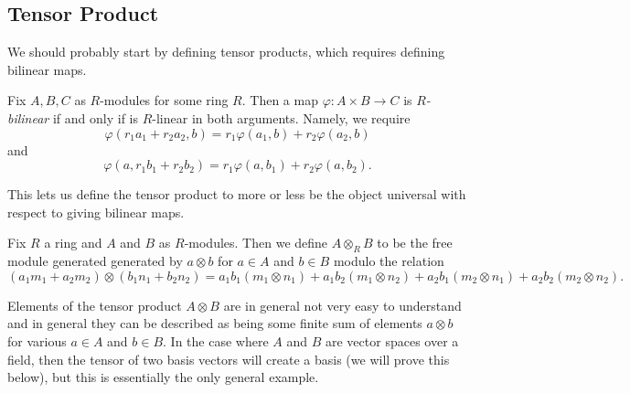 \subsection{Tensor Product}
We should probably start by defining tensor products, which requires defining bilinear maps.
\begin{definition}[Bilinear]
	Fix $A,B,C$ as $R$-modules for some ring $R$. Then a map $\varphi:A\times B\to C$ is \textit{$R$-bilinear} if and only if is $R$-linear in both arguments. Namely, we require
	\[\varphi(r_1a_1+r_2a_2,b)=r_1\varphi(a_1,b)+r_2\varphi(a_2,b)\]
	and
	\[\varphi(a,r_1b_1+r_2b_2)=r_1\varphi(a,b_1)+r_2\varphi(a,b_2).\]
\end{definition}
This lets us define the tensor product to more or less be the object universal with respect to giving bilinear maps.
\begin{definition}
	Fix $R$ a ring and $A$ and $B$ as $R$-modules. Then we define $A\otimes_RB$ to be the free module generated generated by $a\otimes b$ for $a\in A$ and $b\in B$ modulo the relation
	\[(a_1m_1+a_2m_2)\otimes(b_1n_1+b_2n_2)=a_1b_1(m_1\otimes n_1)+a_1b_2(m_1\otimes n_2)+a_2b_1(m_2\otimes n_1)+a_2b_2(m_2\otimes n_2).\]
\end{definition}
Elements of the tensor product $A\otimes B$ are in general not very easy to understand and in general they can be described as being some finite sum of elements $a\otimes b$ for various $a\in A$ and $b\in B$. In the case where $A$ and $B$ are vector spaces over a field, then the tensor of two basis vectors will create a basis (we will prove this below), but this is essentially the only general example.

